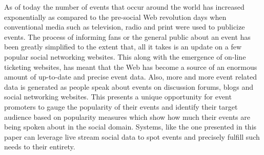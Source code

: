 \documentclass[10pt,a4paper]{article}
\begin{document}
As of today the number of events that occur around the world has increased exponentially as compared to the pre-social Web revolution days when conventional media such as television, radio and print were used to
publicize events. The process of informing fans or the general public about an event has been greatly simplified to the extent that, all it takes is an update on a few popular social networking websites. This along with the emergence of on-line ticketing websites, has meant that the Web has become a source of an enormous amount of up-to-date and precise event data. Also, more and more event related data is generated as people speak about events on discussion forums, blogs and social networking websites. This presents a unique opportunity for event promoters to gauge the popularity of their events and identify their target audience based on popularity measures which show how much their events are being spoken about in the social domain. Systems, like the one presented in this paper can leverage live stream social data to spot events and precisely fulfill such needs to their entirety.



\end{document}
